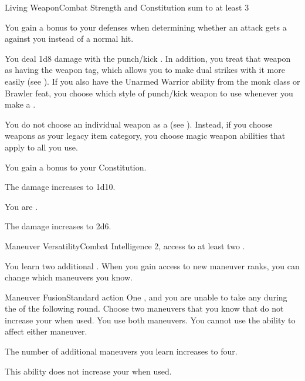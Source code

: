   \begin{feat}{Living Weapon}{Combat}
    \featpre Strength and Constitution sum to at least 3

     You gain a  bonus to your defenses when determining whether an attack gets a  against you instead of a normal hit.

     You deal 1d8 damage with the punch/kick .
    In addition, you treat that weapon as having the  weapon tag, which allows you to make dual strikes with it more easily (see ).
    If you also have the Unarmed Warrior ability from the monk class or Brawler feat, you choose which style of punch/kick weapon to use whenever you make a .

     You do not choose an individual weapon as a  (see ).
    Instead, if you choose weapons as your legacy item category, you choose magic weapon abilities that apply to all  you use.

     You gain a  bonus to your Constitution.

     The damage increases to 1d10.

     You are \steeled.

     The damage increases to 2d6.
  \end{feat}

  \begin{feat}{Maneuver Versatility}{Combat}
    \featpre Intelligence 2, access to at least two .

     You learn two additional .
    When you gain access to new maneuver ranks, you can change which maneuvers you know.

    \begin{activeability}{Maneuver Fusion}{Standard action}
      \abilitycost One , and you are unable to take any  during the  of the following round.
      \rankline
      Choose two maneuvers that you know that do not increase your  when used.
      You use both maneuvers.
      You cannot use the  ability to affect either maneuver.
    \end{activeability}

     The number of additional maneuvers you learn increases to four.

     This ability does not increase your  when used.
  \end{feat}

